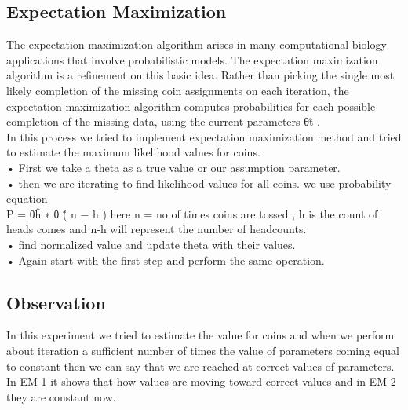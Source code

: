 \documentclass[conference]{IEEEtran}
\begin{document}

\subsection{Expectation Maximization}

The expectation maximization algorithm arises in many computational biology applications that involve probabilistic models. The expectation maximization algorithm is a refinement on this basic idea. Rather than picking the single most likely completion of the missing coin assignments on each iteration, the expectation maximization algorithm computes probabilities for each possible completion of the missing data, using the current parameters θ\^t . \\

In this process we tried to implement expectation maximization method and tried to estimate the maximum likelihood values for coins. \\



• First we take a theta as a true value or our assumption parameter. \\
• then we are iterating to find likelihood values for all coins. we use probability equation \\
   P = θ\^h ∗ θ \^( n − h ) here n = no of times coins are tossed , h is the count of heads comes and n-h will represent the number of headcounts. \\
• find normalized value and update theta with their values. \\
• Again start with the first step and perform the same operation.\\


\subsection{Observation}
In this experiment we tried to estimate the value for coins and when we perform about iteration a sufficient number of times the value of parameters coming equal to constant then we can say that we are reached at correct values of parameters. In EM-1 it shows that how values are moving toward correct values and in EM-2 they are constant now.

\end{document}
